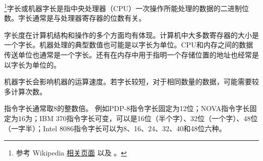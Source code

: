 
\begin{issues}
\issueDraft
\end{issues}

\footnote{参考 Wikipedia \href{https://en.wikipedia.org/wiki/Word_(computer_architecture)}{相关页面} 以及 \cite{唐计}。}字长或机器字长是指中央处理器（CPU）一次操作所能处理的数据的二进制位数。字长通常是与处理器寄存器的位数有关。

字长度在计算机结构和操作的多个方面均有体现。计算机中大多数寄存器的大小是一个字长。机器处理的典型数值也可能是以字长为单位。CPU和内存之间的数据传送单位也通常是一个字长。还有在内存中用于指明一个存储位置的地址也经常是以字长为单位的。

机器字长会影响机器的运算速度。若字长较短，对于相同数量的数据，可能需要较多计算次数。

指令字长通常取8的整数倍。
例如PDP-8指令字长固定为12位；NOVA指令字长固定为16为；IBM 370指令字长可变，可以是16位（半个字）、32位（一个字）、48位（一字半）；Intel 8086指令字长可以为8、16、24、32、40和48位六种。

